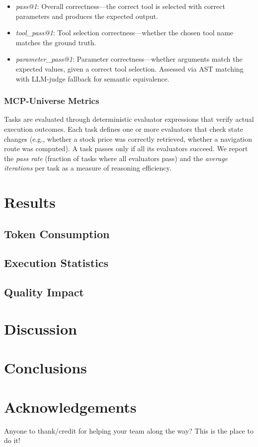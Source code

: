 \documentclass[10pt,twocolumn,letterpaper]{article}
\begin{document}
\begin{itemize}
    \item \textit{pass@1}: Overall correctness---the correct tool is selected with correct parameters and produces the expected output.
    \item \textit{tool\_pass@1}: Tool selection correctness---whether the chosen tool name matches the ground truth.
    \item \textit{parameter\_pass@1}: Parameter correctness---whether arguments match the expected values, given a correct tool selection. Assessed via AST matching with LLM-judge fallback for semantic equivalence.
\end{itemize}

\subsubsection{MCP-Universe Metrics}
Tasks are evaluated through deterministic evaluator expressions that verify actual execution outcomes. Each task defines one or more evaluators that check state changes (e.g., whether a stock price was correctly retrieved, whether a navigation route was computed). A task passes only if all its evaluators succeed. We report the \textit{pass rate} (fraction of tasks where all evaluators pass) and the \textit{average iterations} per task as a measure of reasoning efficiency.

\section{Results}
\label{sec:results}

\subsection{Token Consumption}

\subsection{Execution Statistics}

\subsection{Quality Impact}

\section{Discussion}

\section*{Conclusions}

\section*{Acknowledgements}
Anyone to thank/credit for helping your team along the way? This is the place to do it!


\end{document}
